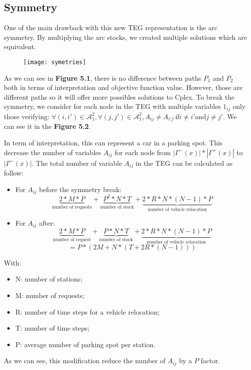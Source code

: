 \begin{bibunit}[ieeetr]
\section{Symmetry}
One of the main drawback with this new TEG representation is the arc symmetry.
By multiplying the arc stocks, we created multiple solutions which are equivalent.

\begin{figure}[!h]
\texttt{[image: symetries]}
\end{figure}

As we can see in \textbf{Figure 5.1}, there is no difference between paths $P_1$ and $P_2$ both in terms of interpretation and objective function value.
However, those are different paths so it will offer more possibles solutions to Cplex.
To break the symmetry, we consider for each node in the TEG with multiple variables $1_{ij}$ only those verifying: $\forall (i, i\prime) \in \mathcal{A}_1^{2},\forall (j, j\prime) \in \mathcal{A}_1^{2}, A_{ij} \neq A_{i\prime j\prime} \text{if} i \neq i\prime \text{and} j\neq j\prime $.
We can see it in the \textbf{Figure 5.2}.

In term of interpretation, this can represent a car in a parking spot.
This decrease the number of variables $A_{ij}$ for each node from $|\Gamma^{-}(x)|*|\Gamma^{+}(x)|$ to $|\Gamma^{-}(x)|$.
The total number of variable $A_{ij}$ in the TEG can be calculated as follow: 

\begin{itemize}
\item
For $A_{ij}$ before the symmetry break: $$\underbrace{2 * M * P }_\textrm{number of requests} + \underbrace{P^{2} * N * T}_\textrm{number of stock} + \underbrace{2* R * N * (N -1) * P}_\textrm{number of vehicle relocation}$$
\item
For $A_{ij}$ after: $$\underbrace{2 * M * P }_\textrm{number of request} + \underbrace{P * N * T}_\textrm{number of stock} + \underbrace{2* R * N * (N -1) * P}_\textrm{number of vehicle relocation}$$
$$ = P * ( 2M + N * (T + 2R * (N-1)))$$
\end{itemize}
With:
\begin{itemize}
\item N: number of stations;
\item M: number of requests;
\item R: number of time steps for a vehicle relocation;
\item T: number of time steps;
\item P: average number of parking spot per station.
\end{itemize}
As we can see, this modification reduce the number of $A_{ij}$ by a $P$ factor.


\end{bibunit}
